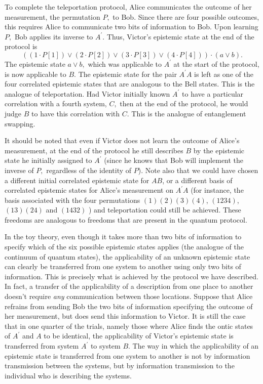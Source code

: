 \documentclass[pra,twocolumn,nofootinbib,showpacs]{revtex4}
\begin{document}
To complete the teleportation protocol, Alice communicates the outcome of
her measurement, the permutation $P,$ to Bob$.$ Since there are four
possible outcomes, this requires Alice to communicate two bits of
information to Bob. Upon learning $P,$ Bob applies its inverse to $A^{\prime
}$. Thus, Victor's epistemic state at the end of the protocol is
\begin{equation*}
((1\cdot P[1])\vee (2\cdot P[2])\vee (3\cdot P[3])\vee (4\cdot P[4]))\cdot
(a\vee b).
\end{equation*}
The epistemic state $a\vee b,$ which was applicable to $A^{\prime }$ at the
start of the protocol, is now applicable to $B.$ The epistemic state for the
pair $A^{\prime }A$ is left as one of the four correlated epistemic states
that are analogous to the Bell states. This is the analogue of
teleportation. Had Victor initially known $A^{\prime }$ to have a particular
correlation with a fourth system, $C,$ then at the end of the protocol, he
would judge $B$ to have this correlation with $C.$ This is the analogue of
entanglement swapping.

It should be noted that even if Victor does not learn the outcome of Alice's
measurement, at the end of the protocol he still describes $B$ by the
epistemic state he initially assigned to $A^{\prime }$ (since he knows that
Bob will implement the inverse of $P,$ regardless of the identity of $P$).
Note also that we could have chosen a different initial correlated epistemic
state for $AB$, or a different basis of correlated epistemic states for
Alice's measurement on $A^{\prime }A$ (for instance, the basis associated
with the four permutations $(1)(2)(3)(4)$, $(1234)$, $(13)(24)$ and $(1432)$%
) and teleportation could still be achieved. These freedoms are analogous to
freedoms that are present in the quantum protocol.

In the toy theory, even though it takes more than two bits of information to
specify which of the six possible epistemic states applies (the analogue of
the continuum of quantum states), the applicability of an unknown epistemic
state can clearly be transferred from one system to another using only two
bits of information. This is precisely what is achieved by the protocol we
have described. In fact, a transfer of the applicability of a description
from one place to another doesn't require \emph{any} communication between
those locations. Suppose that Alice refrains from sending Bob the two bits
of information specifying the outcome of her measurement, but does send this
information to Victor. It is still the case that in one quarter of the
trials, namely those where Alice finds the ontic states of $A^{\prime }$ and
$A$ to be identical, the applicability of Victor's epistemic state is
transferred from system $A^{\prime }$ to system $B.$ The way in which the
applicability of an epistemic state is transferred from one system to
another is not by information transmission between the systems, but by
information transmission to the individual who is describing the systems.
\end{document}
